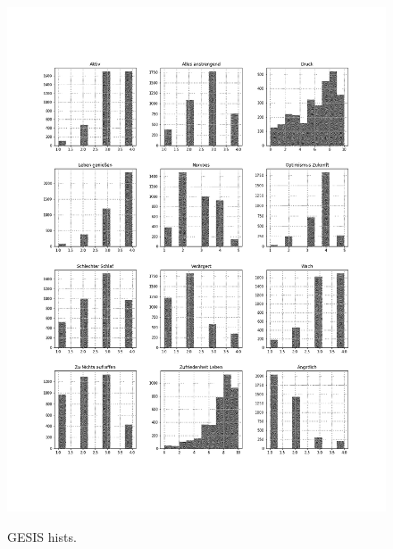 \begin{figure}[ht]
	\begin{center}
		\includegraphics[scale=0.44,angle=0]{fig/gesis_hist}
		\label{std}
		\caption{GESIS hists.}
	\end{center}
\end{figure}

